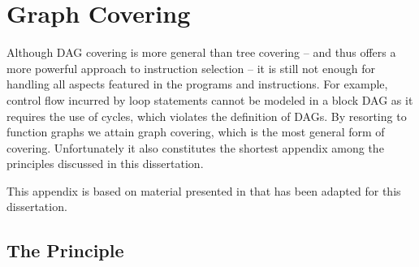 %

\chapter{Graph Covering}


Although \gls{DAG covering} is more general than \gls{tree covering} -- and thus
offers a more powerful approach to \gls{instruction selection} -- it is still
not enough for handling all aspects featured in the \glspl{program} and
\glspl{instruction}.
%
For example, control flow incurred by loop statements cannot be modeled in a
\gls{block DAG} as it requires the use of \glspl{cycle}, which violates the
definition of \glspl{DAG}.
%
By resorting to \glspl{function graph} we attain \gls{graph covering}, which is
the most general form of covering.
%
Unfortunately it also constitutes the shortest appendix among the
\glspl{principle} discussed in this dissertation.

This appendix is based on material presented in
\cite[Chap.]{HjortBlindell:2016:Survey} that has been adapted for
this dissertation.


\section{The Principle}


